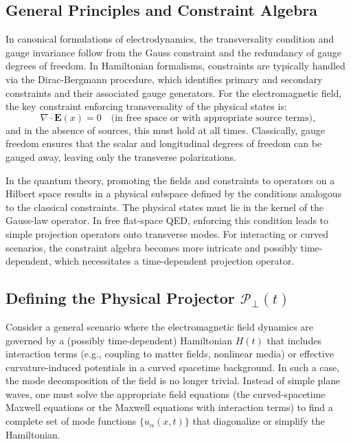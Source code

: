 \documentclass[aps,prl,twocolumn,showpacs,showkeys,superscriptaddress,amsmath,amssymb]{revtex4-2}
\begin{document}
\subsection{General Principles and Constraint Algebra}

In canonical formulations of electrodynamics, the transversality condition and gauge invariance follow from the Gauss constraint and the redundancy of gauge degrees of freedom. In Hamiltonian formalisms, constraints are typically handled via the Dirac-Bergmann procedure, which identifies primary and secondary constraints and their associated gauge generators. For the electromagnetic field, the key constraint enforcing transversality of the physical states is:
\begin{equation}
\nabla \cdot \bm{E}(x) = 0 \quad \text{(in free space or with appropriate source terms)},
\end{equation}
and in the absence of sources, this must hold at all times. Classically, gauge freedom ensures that the scalar and longitudinal degrees of freedom can be gauged away, leaving only the transverse polarizations.

In the quantum theory, promoting the fields and constraints to operators on a Hilbert space results in a physical subspace defined by the conditions analogous to the classical constraints. The physical states must lie in the kernel of the Gauss-law operator. In free flat-space QED, enforcing this condition leads to simple projection operators onto transverse modes. For interacting or curved scenarios, the constraint algebra becomes more intricate and possibly time-dependent, which necessitates a time-dependent projection operator.

\subsection{Defining the Physical Projector \texorpdfstring{$\mathcal{P}_\perp(t)$}{P_perp(t)}}

Consider a general scenario where the electromagnetic field dynamics are governed by a (possibly time-dependent) Hamiltonian $H(t)$ that includes interaction terms (e.g., coupling to matter fields, nonlinear media) or effective curvature-induced potentials in a curved spacetime background. In such a case, the mode decomposition of the field is no longer trivial. Instead of simple plane waves, one must solve the appropriate field equations (the curved-spacetime Maxwell equations or the Maxwell equations with interaction terms) to find a complete set of mode functions $\{u_{\alpha}(x,t)\}$ that diagonalize or simplify the Hamiltonian.
\end{document}
